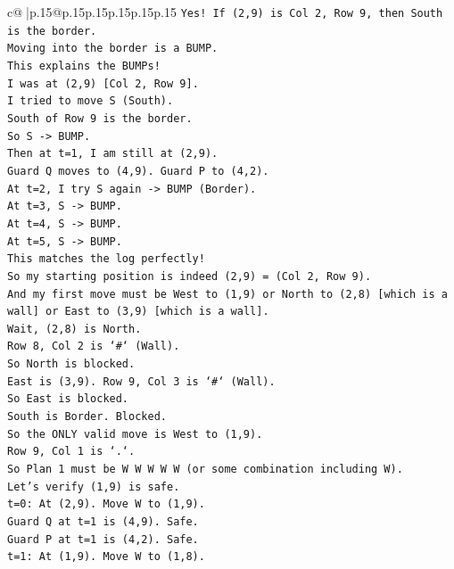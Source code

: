 \documentclass{article}
\begin{document}
{\begin{supertabular}{c@{$\;$}|p{.15\linewidth}@{}p{.15\linewidth}p{.15\linewidth}p{.15\linewidth}p{.15\linewidth}p{.15\linewidth}}
{{{\texttt{Yes! If (2,9) is Col 2, Row 9, then South is the border.} \\
\texttt{Moving into the border is a BUMP.} \\
\texttt{This explains the BUMPs!} \\
\texttt{I was at (2,9) {[}Col 2, Row 9{]}.} \\
\texttt{I tried to move S (South).} \\
\texttt{South of Row 9 is the border.} \\
\texttt{So S {-}> BUMP.} \\
\texttt{Then at t=1, I am still at (2,9).} \\
\texttt{Guard Q moves to (4,9). Guard P to (4,2).} \\
\texttt{At t=2, I try S again {-}> BUMP (Border).} \\
\texttt{At t=3, S {-}> BUMP.} \\
\texttt{At t=4, S {-}> BUMP.} \\
\texttt{At t=5, S {-}> BUMP.} \\
\texttt{This matches the log perfectly!} \\
\texttt{So my starting position is indeed (2,9) = (Col 2, Row 9).} \\
\texttt{And my first move must be West to (1,9) or North to (2,8) {[}which is a wall{]} or East to (3,9) {[}which is a wall{]}.} \\
\texttt{Wait, (2,8) is North.} \\
\texttt{Row 8, Col 2 is `\#` (Wall).} \\
\texttt{So North is blocked.} \\
\texttt{East is (3,9). Row 9, Col 3 is `\#` (Wall).} \\
\texttt{So East is blocked.} \\
\texttt{South is Border. Blocked.} \\
\texttt{So the ONLY valid move is West to (1,9).} \\
\texttt{Row 9, Col 1 is `.`.} \\
\texttt{So Plan 1 must be W W W W W (or some combination including W).} \\
\texttt{Let's verify (1,9) is safe.} \\
\texttt{t=0: At (2,9). Move W to (1,9).} \\
\texttt{Guard Q at t=1 is (4,9). Safe.} \\
\texttt{Guard P at t=1 is (4,2). Safe.} \\
\texttt{t=1: At (1,9). Move W to (1,8).} \\
}}}
\end{supertabular}}
\end{document}
